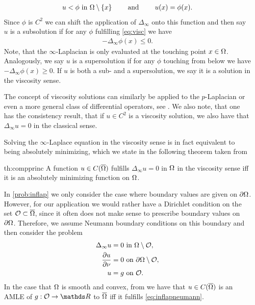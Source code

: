 %
\begin{align}\label{eq:visc}
u < \phi \text{ in } \Omega\setminus\{x\}\qquad\text{ and }\qquad u(x) = \phi(x).
\end{align}
%
Since $\phi$ is $C^2$ we can shift the application of $\Delta_\infty$ onto this function and then say $u$ is a subsolution if for any $\phi$ fulfilling \cref{eq:visc} we have
%
\begin{align*}
- \Delta_\infty \phi(x) \leq 0.
\end{align*}
%
Note, that the $\infty$-Laplacian is only evaluated at the touching point $x\in\Omega$. Analogously, we say $u$ is a supersolution if for any $\phi$ touching from below we have $- \Delta_\infty \phi(x) \geq 0$. If $u$ is both a sub- and a supersolution, we say it is a solution in the viscosity sense. 
%
\begin{remark}{}{}
The concept of viscosity solutions can similarly be applied to the $p$-Laplacian or even a more general class of differential operators, see \cite{lindqvist2017notes}. We also note, that one has the consistency result, that if $u\in C^2$ is a viscosity solution, we also have that $\Delta_\infty u = 0$ in the classical sense. 
\end{remark}
%
%
\noindent%
Solving the $\infty$-Laplace equation in the viscosity sense is in fact equivalent to being absolutely minimizing, which we state in the following theorem taken from \cite{aronsson2004tour}
%
\begin{theorem}{\cite[Thm. 4.13]{aronsson2004tour}}{th:compprinc}
A function $u\in C(\overline{\Omega})$ fulfills $\Delta_\infty u=0$ in $\Omega$ in the viscosity sense iff it is an absolutely minimizing function on $\Omega$.
\end{theorem}
%
%
\noindent
In \cref{prob:inflap} we only consider the case where boundary values are given on $\partial\Omega$. However, for our application we would rather have a Dirichlet condition on the set $\mathcal{O}\subset\overline{\Omega}$, since it often does not make sense to prescribe boundary values on $\partial\Omega$. Therefore, we assume Neumann boundary conditions on this boundary and then consider the problem
%
\begin{align}\label{eq:inflapneumann}
\begin{aligned}
\Delta_\infty u = 0 &\text{ in }\Omega\setminus\mathcal{O},\\
\frac{\partial u}{\partial \nu} = 0 &\text{ on }\partial\Omega\setminus\mathcal{O},\\
u = g &\text{ on }\mathcal{O}.
\end{aligned}
\end{align}
%
In the case that $\Omega$ is smooth and convex, from \cite[Lem. 3.1]{armstrong2011infinity} we have that $u\in C(\overline{\Omega})$ is an AMLE of $g:\conset\to\R$ to $\overline{\Omega}$ iff it fulfills \cref{eq:inflapneumann}.\par

